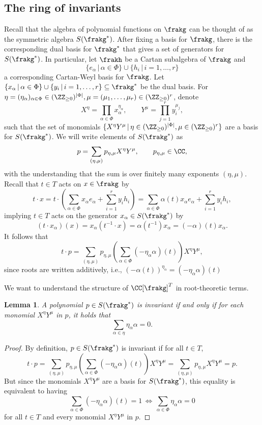 \documentclass[12pt]{amsart}
\theoremstyle{plain}
\newtheorem{lemma}[theorem]{Lemma}
\begin{document}
\subsection{The ring of invariants}
Recall that the algebra of polynomial functions on $\frakg$ can be thought of as the symmetric algebra $S(\frakg^*)$.
After fixing a basis for $\frakg$, there is the corresponding dual basis for $\frakg^*$ that gives a set of generators for $S(\frakg^*)$.
In particular, let $\frakh$ be a Cartan subalgebra of $\frakg$ and 
$$\{e_\alpha \, | \, \alpha \in \Phi\}\cup\{h_i \, | \, i=1,\ldots, r\}$$
a corresponding Cartan-Weyl basis for $\frakg$.
Let $\{x_\alpha\,|\,\alpha\in\Phi\}\cup\{y_i\,|\,i=1,\ldots,r\}\subseteq\frakg^*$ be the dual basis.
For $\eta = (\eta_\alpha)_{\alpha\in\Phi} \in (\ZZ_{\ge0})^{|\Phi|}, \mu = (\mu_1, \ldots, \mu_r)\in (\ZZ_{\ge0})^r$, denote
$$X^\eta = \prod_{\alpha\in\Phi} x_{\alpha}^{\eta_\alpha}, \qquad Y^\mu = \prod_{j=1}^r y_i^{\mu_j},$$
such that the set of monomials $\{X^\eta Y^\mu\,|\,\eta \in (\ZZ_{\ge0})^{|\Phi|}, \mu\in(\ZZ_{\ge0})^r\}$ are a basis for $S(\frakg^*)$.
We will write elements of $S(\frakg^*)$ as 
$$p = \sum_{(\eta, \mu)} p_{\eta,\mu} X^\eta Y^\mu, \qquad p_{\eta,\mu} \in \CC,$$
with the understanding that the sum is over finitely many exponents $(\eta, \mu)$.
Recall that $t \in T$ acts on $x \in \frakg$ by
$$t \cdot x = t \cdot \left(\sum_{\alpha\in\Phi} x_\alpha e_\alpha + \sum_{i=1}^r y_i h_i \right) = \sum_{\alpha\in\Phi} \alpha(t) x_\alpha e_\alpha + \sum_{i=1}^r y_i h_i,$$
implying $t \in T$ acts on the generator $x_\alpha \in S(\frakg^*)$ by
$$(t\cdot x_\alpha)(x) = x_\alpha(t^{-1} \cdot x) = \alpha(t^{-1}) x_\alpha = (-\alpha)(t) x_\alpha.$$
It follows that 
$$t \cdot p = \sum_{(\eta, \mu)} p_{\eta,\mu} \left(\sum_{\alpha\in\Phi} (- \eta_\alpha \alpha)(t)\right) X^\eta Y^\mu,$$
since roots are written additively, i.e., $(-\alpha(t))^{\eta_\alpha} = (-\eta_\alpha \alpha)(t)$

We want to understand the structure of $\CC[\frakg]^T$ in root-theoretic terms.
\begin{lemma}
A polynomial $p \in S(\frakg^*)$ is invariant if and only if for each monomial $X^\eta Y^\mu$ in $p$, it holds that
$$\sum_{\alpha\in\eta} \eta_\alpha \alpha = 0.$$
\end{lemma}
\begin{proof}
    By definition, $p \in S(\frakg^*)$ is invariant if for all $t \in T$,
    $$t\cdot p = \sum_{(\eta, \mu)} p_{\eta,\mu} \left(\sum_{\alpha\in\Phi} (- \eta_\alpha \alpha)(t)\right) X^\eta Y^\mu = \sum_{(\eta, \mu)} p_{\eta,\mu} X^\eta Y^\mu=p.$$
    But since the monomials $X^\eta Y^\mu$ are a basis for $S(\frakg^*)$, this equality is equivalent to having 
    $$\sum_{\alpha\in\Phi} (- \eta_\alpha \alpha)(t) = 1 \, \iff \, \sum_{\alpha\in\Phi} \eta_\alpha \alpha = 0$$
    for all $t \in T$ and every monomial $X^\eta Y^\mu$ in $p$.
\end{proof}
\end{document}
